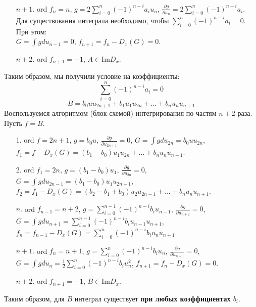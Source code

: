 \documentclass[12pt]{article}
\theoremstyle{definition}
\begin{document}
\begin{itemize}
\begin{itemize}
        \item[$n+1$.] ord $f_n=n$, $g=2\sum\limits_{i=0}^{n} (-1)^{n-i}a_iu_n$, $\frac{\partial g}{\partial u_n}=2\sum\limits_{i=0}^{n} (-1)^{n-i}a_i$.\\
        Для существования интеграла необходимо, чтобы $\sum\limits_{i=0}^{n} (-1)^{n-i}a_i=0$. При этом:\\
        $G=\int gdu_{n-1}=0$, $f_{n+1}=f_n-D_x(G)=0$.
        \item[$n+2$.] ord $f_{n+1}=-1$, $A\in \text{Im} D_x$.
    \end{itemize}
    Таким образом, мы получили условие на коэффициенты:
    \begin{equation}
        \boxed{\sum\limits_{i=0}^n (-1)^{n-i}a_i=0}
    \end{equation}
    \begin{equation}
        B=b_0uu_{2n+1}+b_1u_1u_{2n}+...+b_nu_nu_{n+1}
    \end{equation}
    Воспользуемся алгоритмом (блок-схемой) интегрирования по частям $n+2$ раза. Пусть $f=B$.
    \begin{itemize}
        \item[1.] ord $f=2n+1$, $g=b_0u$, $\frac{\partial g}{\partial u_{2n+1}}=0$, $G=\int gdu_{2n}=b_0uu_{2n}$, $f_1=f-D_x(G)=(b_1-b_0)u_1u_{2n}+...+b_nu_nu_{n+1}$.
        \item[2.] ord $f_1=2n$, $g=(b_1-b_0)u_1$, $\frac{\partial g}{\partial u_{2n}}=0$, $G=\int gdu_{2n-1}=(b_1-b_0)u_1u_{2n-1}$, $f_2=f_1-D_x(G)=(b_2-b_1+b_0)u_2u_{2n-1}+...+b_nu_nu_{n+1}$.
        \item[$n$.] ord $f_{n-1}=n+2$, $g=\sum\limits_{i=0}^{n-1} (-1)^{n-i}b_iu_{n-1}$, $\frac{\partial g}{\partial u_{n+2}}=0$, $G=\int gdu_{n+1}=\sum\limits_{i=0}^{n-1}(-1)^{n-i}b_iu_{n-1}u_{n+1}$, $f_n=f_{n-1}-D_x(G)=\sum\limits_{i=0}^n (-1)^{n-i}b_iu_nu_{n+1}$.
        \item[$n+1$.] ord $f_n=n+1$, $g=\sum\limits_{i=0}^{n} (-1)^{n-i}b_iu_n$, $\frac{\partial g}{\partial u_{n+1}}=0 $, $G=\int gdu_n=\frac{1}{2}\sum\limits_{i=0}^{n} (-1)^{n-i}b_iu_n^2$, $f_{n+1}=f_n-D_x(G)=0$.
        \item[$n+2$.] ord $f_{n+1}=-1$, $B\in \text{Im} D_x$.
    \end{itemize}
    Таким образом, для $B$ интеграл существует \textbf{при любых коэффициентах $b_i$}.
\end{itemize}
\end{document}
